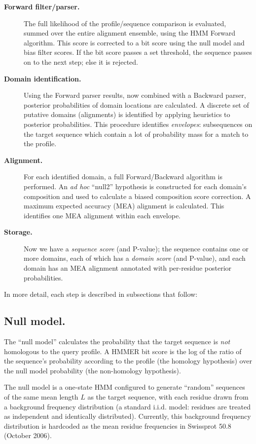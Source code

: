 \begin{description}
\item[\textbf{Forward filter/parser.}] The full likelihood of the
  profile/sequence comparison is evaluated, summed over the entire
  alignment ensemble, using the HMM Forward algorithm. This score is
  corrected to a bit score using the null model and bias filter
  scores. If the bit score passes a set threshold, the sequence passes
  on to the next step; else it is rejected.

\item[\textbf{Domain identification.}] Using the Forward parser
  results, now combined with a Backward parser, posterior
  probabilities of domain locations are calculated. A discrete set of
  putative domains (alignments) is identified by applying heuristics
  to posterior probabilities. This procedure identifies
  \emph{envelopes}: subsequences on the target sequence which contain
  a lot of probability mass for a match to the profile.

\item[\textbf{Alignment.}] For each identified domain, a full
  Forward/Backward algorithm is performed. An \emph{ad hoc} ``null2''
  hypothesis is constructed for each domain's composition and used to
  calculate a biased composition score correction. A maximum expected
  accuracy (MEA) alignment is calculated. This identifies one MEA
  alignment within each envelope.

\item[\textbf{Storage.}] Now we have a \emph{sequence score} (and
  P-value); the sequence contains one or more domains, each of which
  has a \emph{domain score} (and P-value), and each domain has an MEA
  alignment annotated with per-residue posterior probabilities.

\end{description}

In more detail, each step is described in subsections that follow:

\subsection{Null model.}

The ``null model'' calculates the probability that the target sequence
is \emph{not} homologous to the query profile. A HMMER bit score is
the log of the ratio of the sequence's probability according to the
profile (the homology hypothesis) over the null model probability (the
non-homology hypothesis). 

The null model is a one-state HMM configured to generate ``random''
sequences of the same mean length $L$ as the target sequence, with
each residue drawn from a background frequency distribution (a
standard i.i.d. model: residues are treated as independent and
identically distributed). Currently, this background frequency
distribution is hardcoded as the mean residue frequencies in Swissprot
50.8 (October 2006).

